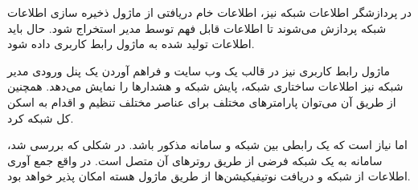 در پردازشگر اطلاعات شبکه نیز، اطلاعات خام دریافتی از ماژول ذخیره سازی اطلاعات شبکه پردازش می‌شوند تا اطلاعات قابل فهم توسط مدیر استخراج شود. حال باید اطلاعات تولید شده به ماژول رابط کاربری داده شود.

ماژول رابط کاربری نیز در قالب یک وب سایت و فراهم آوردن یک پنل ورودی مدیر شبکه نیز اطلاعات ساختاری شبکه، پایش شبکه و هشدارها را نمایش می‌دهد. همچنین از طریق آن می‌توان پارامترهای مختلف برای عناصر مختلف تنظیم و اقدام به اسکن کل شبکه کرد.

اما نیاز است که یک رابطی بین شبکه و سامانه مذکور باشد. در شکلی که بررسی شد، سامانه به یک شبکه فرضی از طریق روترهای آن متصل است. در واقع جمع آوری اطلاعات از شبکه و دریافت نوتیفیکیشن‌ها از طریق ماژول هسته  امکان پذیر خواهد بود.
